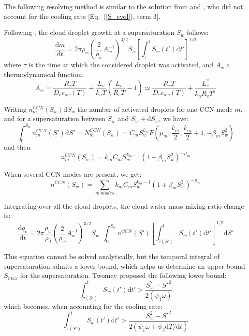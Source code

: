 The following resolving method is similar to the solution from \citet{Pruppacher1997} and \citet{Cohard1998}, who did not account for the cooling rate [Eq.~(\ref{S_evol}), term 3].

Following \citet[][their Eqs.\ (13)-(34)]{Pruppacher1997}, the cloud droplet growth at a supersaturation $S_w$ follows:
\begin{equation}
 \frac{\mathrm{d}m}{\mathrm{d}t} = 2 \pi \rho_w \left(\frac{2}{\rho_w}A_w^{-1}\right)^{3/2} S_w \left[ \int_{\tau}^t S_w(t')\mathrm{d}t' \right]^{1/2}
\end{equation}
where $\tau$ is the time at which the considered droplet was activated, and $A_w$ a thermodynamical function:
\begin{equation}
 A_w = \frac{R_vT}{D_v e_{sw}(T)} + \frac{L_v}{k_aT}\left(\frac{L_v}{R_vT}-1\right) \simeq \frac{R_vT}{D_v e_{sw}(T)} + \frac{L_v^2}{k_aR_vT^2}
\end{equation}

Writing $n_m^{CCN}(S_w)\mathrm{d}S_w$ the number of activated droplets for one CCN mode $m$, and for a supersaturation between $S_w$ and $S_w+\mathrm{d}S_w$, we have:
\begin{equation}
 \int_0^{S_w} n_m^{CCN}(S')\mathrm{d}S' = N_m^{CCN}(S_w) = C_m S_w^{k_m} F(\mu_m,\frac{k_m}{2},\frac{k_m}{2}+1,-\beta_m S_w^2)
\end{equation}
and then
\begin{equation}
 n_m^{CCN}(S_w) = k_m C_m S_w^{k_m-1} (1+\beta_m S_w^2)^{-\mu_m} 
\end{equation}

When several CCN modes are present, we get:
\begin{equation}
 n^{CCN}(S_w) = \sum_{m~modes} k_m C_m S_w^{k_m-1} (1+\beta_m S_w^2)^{-\mu_m}
\end{equation}

Integrating over all the cloud droplets, the cloud water mass mixing ratio change is:
\begin{equation}
 \frac{\mathrm{d}q_c}{\mathrm{d}t} = 2 \pi \frac{\rho_w}{\rho_d} \left(\frac{2}{\rho_w} A_w^{-1}\right)^{3/2} S_w ~~ \int_0^{S_w} n^{CCN}(S') \left[ \int_{\tau(S')}^t S_w(t')\mathrm{d}t' \right]^{1/2} \mathrm{d}S'
\end{equation}

This equation cannot be solved analytically, but the temporal integral of supersaturation admits a lower bound, which helps us determine an upper bound $S_{max}$ for the supersaturation. Twomey proposed \citep[their Eqs.\ (13)-(37)]{Pruppacher1997} the following lower bound:
\begin{equation}
 \int_{\tau(S')}^t S_w(t')\mathrm{d}t' > \frac{S_w^2-S'^2}{2(\psi_1 \omega)}
\end{equation}
which becomes, when accounting for the cooling rate:
\begin{equation}
 \int_{\tau(S')}^t S_w(t')\mathrm{d}t' > \frac{S_w^2-S'^2}{2(\psi_1 \omega + \psi_3 \mathrm{d}T/\mathrm{d}t)}
\end{equation}

